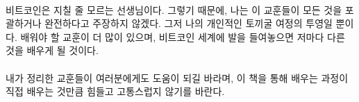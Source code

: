 \paragraph{}
비트코인은 지칠 줄 모르는 선생님이다. 그렇기 때문에, 나는 이 교훈들이 모든 것을 포괄하거나 완전하다고 주장하지 않겠다.
그저 나의 개인적인 토끼굴 여정의 투영일 뿐이다. 배워야 할 교훈이 더 많이 있으며, 비트코인 세계에 발을 들여놓으면 저마다 다른 것을 배우게 될 것이다. 

\paragraph{}
내가 정리한 교훈들이 여러분에게도 도움이 되길 바라며, 이 책을 통해 배우는 과정이 직접 배우는 것만큼 힘들고 고통스럽지 않기를 바란다. 

%
%
